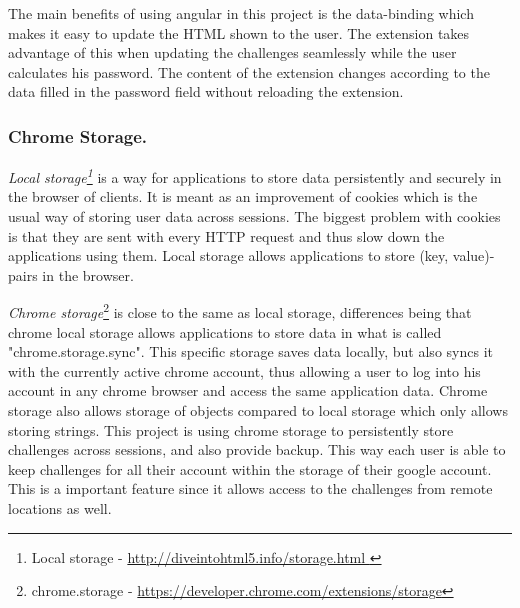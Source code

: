 \par The main benefits of using angular in this project is the data-binding which makes it easy to update the HTML shown to the user. The extension takes advantage of this when updating the challenges seamlessly while the user calculates his password. The content of the extension changes according to the data filled in the password field without reloading the extension. 

\subsubsection{Chrome Storage.}\label{chrome-storage}
\emph{Local storage\footnote{Local storage - \url{ http://diveintohtml5.info/storage.html }}} is a way for applications to store data persistently and securely in the browser of clients. It is meant as an improvement of cookies which is the usual way of storing user data across sessions. The biggest problem with cookies is that they are sent with every HTTP request and thus slow down the applications using them. Local storage allows applications to store (key, value)-pairs in the browser. 
\par \emph{Chrome storage}\footnote{chrome.storage - \url{https://developer.chrome.com/extensions/storage}} is close to the same as local storage, differences being that chrome local storage allows applications to store data in what is called "chrome.storage.sync". This specific storage saves data locally, but also syncs it with the currently active chrome account, thus allowing a user to log into his account in any chrome browser and access the same application data. Chrome storage also allows storage of objects compared to local storage which only allows storing strings. This project is using chrome storage to persistently store challenges across sessions, and also provide backup. This way each user is able to keep challenges for all their account within the storage of their google account. This is a important feature since it allows access to the challenges from remote locations as well.


